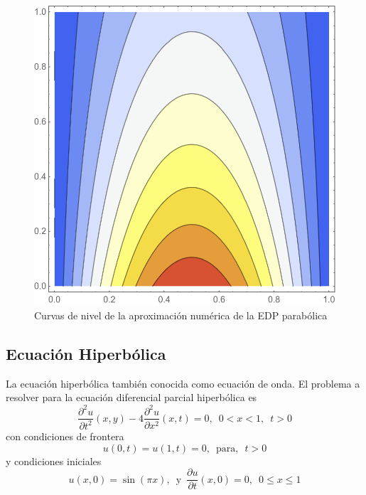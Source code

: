 \documentclass[a4paper]{article}
\begin{document}
\begin{figure}[H]
\begin{center}
\includegraphics[scale=0.29]{./parabolic_contour.png} 
\end{center} 
\caption{Curvas de nivel de la aproximación numérica de la EDP parabólica}
\label{fig::fig6}
\end{figure}



\subsection{Ecuación Hiperbólica}
La ecuación hiperbólica también conocida como ecuación de onda. El problema a resolver para la ecuación diferencial parcial hiperbólica es 
\begin{equation} \label{eq::wave_equation}
\frac{\partial^2 u}{\partial t^2}(x,y)-4\frac{\partial ^2 u}{\partial x^2}(x,t)=0,\,\,\,0<x<1,\,\,\,t>0
\end{equation}
con condiciones de frontera 
\begin{equation}
u(0,t)=u(1,t)=0,\,\,\, \text{para, }\,\,t>0
\end{equation}
y condiciones iniciales
\begin{equation}
u(x,0)=\sin(\pi x), \,\,\, \text{y}\,\,\,\frac{\partial u}{\partial t}(x,0)=0,\,\,\, 0\leq x \leq 1
\end{equation}
\end{document}
